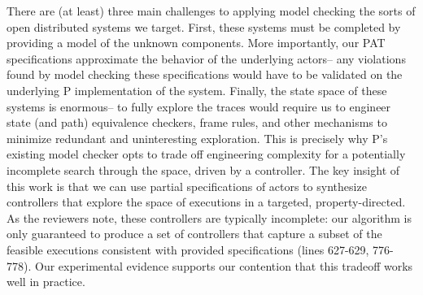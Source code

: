 There are (at least) three main challenges to applying model checking
the sorts of open distributed systems we target. First, these systems
must be completed by providing a model of the unknown components. More
importantly, our PAT specifications approximate the behavior of the
underlying actors-- any violations found by model checking these
specifications would have to be validated on the underlying P
implementation of the system. Finally, the state space of these
systems is enormous-- to fully explore the traces would require us to
engineer state (and path) equivalence checkers, frame rules, and other
mechanisms to minimize redundant and uninteresting exploration. This
is precisely why P's existing model checker opts to trade off
engineering complexity for a potentially incomplete search through the
space, driven by a controller. The key insight of this work is that we
can use partial specifications of actors to synthesize controllers
that explore the space of executions in a targeted, property-directed.
As the reviewers note, these controllers are typically incomplete: our
algorithm is only guaranteed to produce a set of controllers that
capture a subset of the feasible executions consistent with provided
specifications (lines 627-629, 776-778). Our experimental evidence
supports our contention that this tradeoff works well in practice.


%



